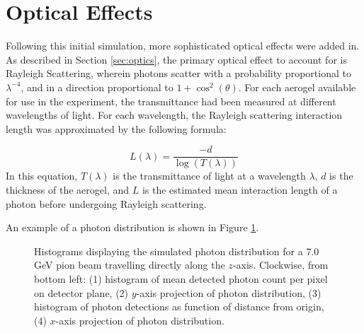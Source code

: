 \section{Optical Effects}
Following this initial simulation, more sophisticated optical effects were added in.
As described in Section \ref{sec:optics}, the primary optical effect to account for is Rayleigh Scattering, wherein photons scatter with a probability proportional to $\lambda^{-4}$, and in a direction proportional to $1 + \cos^2(\theta)$.
For each aerogel available for use in the experiment, the transmittance had been measured at different wavelengths of light.
For each wavelength, the Rayleigh scattering interaction length was approximated by the following formula:

$$
L(\lambda) = \frac{-d}{\log(T(\lambda))}
 $$
 In this equation, $T(\lambda)$ is the transmittance of light at a wavelength $\lambda$, $d$ is the thickness of the aerogel, and $L$ is the estimated mean interaction length of a photon before undergoing Rayleigh scattering.


An example of a photon distribution is shown in Figure \ref{fig:photonHist}.

\begin{figure}[]
\centering
{}
\caption[Example of simulated photon distribution for centered 7.0 GeV pion beam]{Histograms displaying the simulated photon distribution for a 7.0 GeV pion beam travelling directly along the $z$-axis. Clockwise, from bottom left: (1) histogram of mean detected photon count per pixel on detector plane, (2) $y$-axis projection of photon distribution, (3) histogram of photon detections as function of distance from origin, (4) $x$-axis projection of photon distribution. }
\label{fig:photonHist} 
\end{figure}

